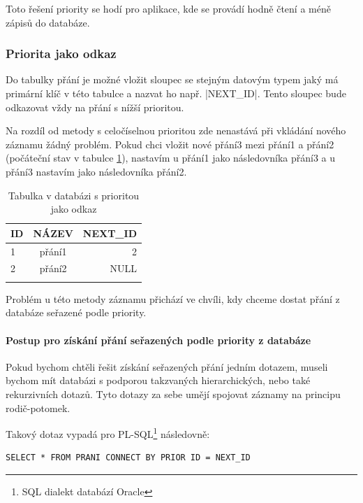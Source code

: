 Toto řešení priority se hodí pro aplikace, kde se provádí hodně čtení a méně zápisů do databáze.

\subsubsection{Priorita jako odkaz} 
Do tabulky přání je možné vložit sloupec se stejným datovým typem jaký má primární klíč v této tabulce a nazvat ho např. |NEXT_ID|. Tento sloupec bude odkazovat vždy na přání s nížší prioritou.

Na rozdíl od metody s celočíselnou prioritou zde nenastává při vkládání nového záznamu žádný problém. Pokud chci vložit nové přání3 mezi přání1 a přání2 (počáteční stav v tabulce \ref{tab:pointer-priority}), nastavím u přání1 jako následovníka přání3 a u přání3 nastavím jako následovníka přání2.

\begin{table}[htb]
	\begin{center}
	  \begin{tabular}{ | l | c | r | }
	    \hline
	    ID & NÁZEV & NEXT\_ID  \\ \hline \hline
	    1 & přání1 & 2  \\ \hline
	    2 & přání2 & NULL \\ \hline
	     & &  \\ \hline
	  \end{tabular}
	  \caption{Tabulka v databázi s prioritou jako odkaz}
	  \label{tab:pointer-priority}
	\end{center}
\end{table}

Problém u této metody záznamu přichází ve chvíli, kdy chceme dostat přání z databáze seřazené podle priority.

\paragraph{Postup pro získání přání seřazených podle priority z databáze}
Pokud bychom chtěli řešit získání seřazených přání jedním dotazem, museli bychom mít databázi s podporou takzvaných hierarchických, nebo také rekurzivních dotazů. Tyto dotazy za sebe umějí spojovat záznamy na principu rodič-potomek\cite{website:wiki:hierarchical-queries}.

Takový dotaz vypadá pro PL-SQL\footnote{SQL dialekt databází Oracle} následovně\cite{website:oracle:hierarchical}:
\begin{lstlisting}
SELECT * FROM PRANI CONNECT BY PRIOR ID = NEXT_ID
\end{lstlisting}

